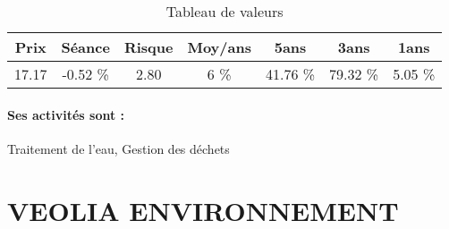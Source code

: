 \documentclass[11pt,a4paper]{report}%
\begin{document}
\begin{table}[H]
  \centering
    \begin{tabular}{|c|c|c|c|c|c|c|}
    \hline
    Prix & Séance & Risque  & Moy/ans & 5ans & 3ans & 1ans \\
    \hline
    17.17 &    -0.52 \%    & 2.80 & 6 \% & 41.76 \% & 79.32 \% & 5.05 \% \\
    \hline
    \end{tabular}%
        \label{tab:table_SUEZ}%
      \caption{Tableau de valeurs}
\end{table}%

\paragraph{Ses activités sont : } Traitement de l'eau, Gestion des déchets 
    
    \newpage

\section{VEOLIA ENVIRONNEMENT}
\end{document}
